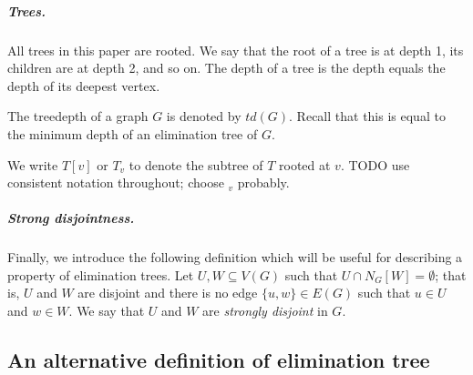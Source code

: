\subparagraph*{Trees.} All trees in this paper are rooted.  We say that the root of a tree is at depth 1,
its children are at depth 2, and so on.  The depth of a tree is the depth equals
the depth of its deepest vertex.

The treedepth of a graph $G$ is denoted by $td(G)$.  Recall that this is equal to the
minimum depth of an elimination tree of $G$.

We write $T[v]$ or $T_v$ to denote the subtree of $T$ rooted at $v$.  TODO use consistent notation
throughout; choose $_v$ probably.

\subparagraph*{Strong disjointness.} Finally, we introduce the following
definition which will be useful for describing a property of elimination trees.
Let $U,W \subseteq V(G)$ such that $U \cap N_G[W] = \emptyset$; that is, $U$
and $W$ are disjoint and there is no edge $\{u,w\} \in E(G)$ such that $u \in
U$ and $w \in W$.  We say that $U$ and $W$ are \emph{strongly disjoint} in $G$.

\subsection{An alternative definition of elimination tree}

